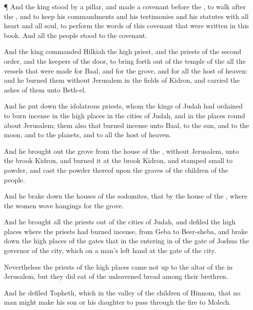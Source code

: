 {\par }{\PP {}¶ And the
king
stood by a
pillar, and
made a
covenant
before the
{}, to
walk
after the
{}, and to
keep his
commandments and his
testimonies and his
statutes with all
{}
heart and all
{}
soul, to
perform the
words of this
covenant that were
written in this
book. And all the
people
stood to the
covenant.


\par }{\PP {}And the
king
commanded
Hilkiah the
high
priest, and the
priests of the second
order, and the
keepers of the
door, to bring
forth out of the
temple of the
{} all the
vessels that were
made for
Baal, and for the
grove, and for all the
host of
heaven: and he
burned them
without
Jerusalem in the
fields of
Kidron, and
carried the
ashes of them unto
Beth-el.

And he put
down the idolatrous
priests, whom the
kings of
Judah had
ordained to burn
incense in the high
places in the
cities of
Judah, and in the places round
about
Jerusalem; them also that burned
incense unto
Baal, to the
sun, and to the
moon, and to the
planets, and to all the
host of
heaven.

And he brought
out the
grove from the
house of the
{},
without
Jerusalem, unto the
brook
Kidron, and
burned it at the
brook
Kidron, and stamped
{}
small to
powder, and
cast the
powder thereof upon the
graves of the
children of the
people.

And he brake
down the
houses of the
sodomites, that
{} by the
house of the
{}, where the
women
wove
hangings for the
grove.

And he
brought all the
priests out of the
cities of
Judah, and
defiled the high
places where the
priests had burned
incense, from
Geba to
Beer-sheba, and brake
down the high
places of the
gates that
{} in the entering
in of the
gate of
Joshua the
governor of the
city, which
{} on a
man’s left
hand at the
gate of the
city.

Nevertheless the
priests of the high
places came not
up to the
altar of the
{} in
Jerusalem, but they did
eat of the unleavened
bread
among their
brethren.

And he
defiled
Topheth, which
{} in the
valley of the
children of
Hinnom, that no
man might make his
son or his
daughter to pass
through the
fire to
Molech.

}
